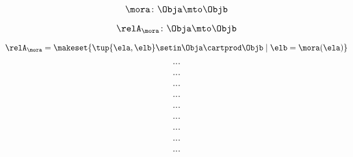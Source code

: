 \begin{forslides}
    \begin{equation}
        \label{eq:slides_trace_monoidal_37}
        \mora \colon \Obja \mto \Objb
    \end{equation}

    \begin{equation}
        \label{eq:slides_trace_monoidal_38}
        \relA_\mora \colon \Obja \mto \Objb
    \end{equation}

    \begin{equation}
        \label{eq:slides_trace_monoidal_39}
        \relA_\mora = \makeset{ \tup{\ela, \elb} \setin \Obja \cartprod \Objb \mid \elb = \mora(\ela)}
    \end{equation}

    \begin{equation}
        \label{eq:slides_trace_monoidal_40}
        ...
    \end{equation}

    \begin{equation}
        \label{eq:slides_trace_monoidal_41}
        ...
    \end{equation}

    \begin{equation}
        \label{eq:slides_trace_monoidal_42}
        ...
    \end{equation}

    \begin{equation}
        \label{eq:slides_trace_monoidal_43}
        ...
    \end{equation}

    \begin{equation}
        \label{eq:slides_trace_monoidal_44}
        ...
    \end{equation}

    \begin{equation}
        \label{eq:slides_trace_monoidal_45}
        ...
    \end{equation}

    \begin{equation}
        \label{eq:slides_trace_monoidal_46}
        ...
    \end{equation}

    \begin{equation}
        \label{eq:slides_trace_monoidal_47}
        ...
    \end{equation}

    \begin{equation}
        \label{eq:slides_trace_monoidal_48}
        ...
    \end{equation}


\end{forslides}
